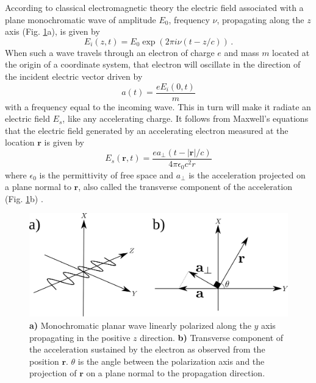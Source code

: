 According to classical electromagnetic theory the electric field associated with a plane monochromatic wave of
amplitude $E_0$, frequency $\nu$, propagating along the $z$ axis
(Fig. \ref{coordinate_axis}a), is given by
\begin{equation}
E_i(z,t) = E_0 \exp(2 \pi i \nu (t-z/c)) \, .
\label{Eq:wave_propagation}
\end{equation}
When such a wave travels through an electron of charge $e$ and mass $m$ located at the origin of a coordinate
system, that electron will oscillate in the direction of the incident electric 
vector driven by
\begin{equation}
a(t) = \frac{e E_i(0,t)}{m}
\label{Eq:electron_acceleration}
\end{equation}
with a frequency equal to the incoming wave. This in turn will make it radiate
an electric field $E_s$, like any accelerating charge. It follows from Maxwell's
equations that the electric field generated by an accelerating electron measured
at the location $\mathbf r$ is given by
\begin{equation}
E_s( \mathbf r,t) = \frac{e a_{\perp}(t - |\mathbf r|/c)}{4 \pi \epsilon_0 c^2 r}
\label{Eq:scattering_by_accelerating_charge}
\end{equation}
where  $\epsilon_0$ is the permittivity of free space and $a_{\perp}$ is the
acceleration projected on a plane normal to $\mathbf r$, also called the
transverse component of the acceleration (Fig. \ref{coordinate_axis}b) \cite{Attwood2007Soft}. 
\begin{figure}[h]
\centering
\includegraphics[width=1 \columnwidth]{Diffraction_Theory/coordinate_acceleration.png}
\caption{{\bf a)} Monochromatic planar wave linearly polarized along the $y$ axis
  propagating in the positive $z$ direction. {\bf b)} Transverse component of the
  acceleration sustained by the electron as observed from the position ${\mathbf r}$. $\theta$ is the angle between the polarization axis and the projection of $\mathbf r$ on a plane normal to the propagation direction.}
\label{coordinate_axis}
\end{figure}
